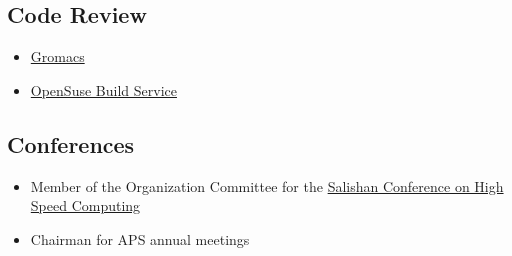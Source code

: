 \documentclass{article}
\begin{document}
\subsection*{Code Review}

\begin{itemize}
\setlength{\itemsep}{0pt}
\setlength{\parskip}{0pt}
\setlength{\parsep}{0pt}
\item \href{https://gerrit.gromacs.org}{Gromacs}
\item \href{https://build.opensuse.org}{OpenSuse Build Service}
\end{itemize}

\subsection*{Conferences}

\begin{itemize}
\setlength{\itemsep}{0pt}
\setlength{\parskip}{0pt}
\setlength{\parsep}{0pt}
\item Member of the Organization Committee for the \href{http://salishan.ahsc-nm.org/}{Salishan Conference on High Speed Computing}
\item Chairman for APS annual meetings
\end{itemize}
\end{document}
